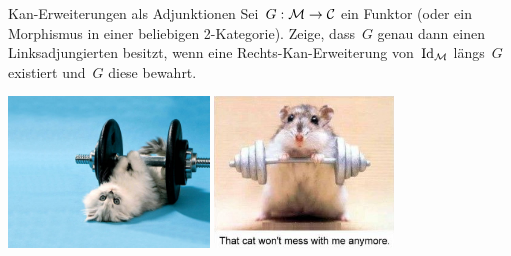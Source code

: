 \documentclass{uebblatt}
\begin{document}

\begin{aufgabe}{Kan-Erweiterungen als Adjunktionen}
Sei~$G : \mathcal{M} \to \mathcal{C}$ ein Funktor (oder ein Morphismus in einer beliebigen
2-Kategorie). Zeige, dass~$G$ genau dann einen Linksadjungierten besitzt, wenn
eine Rechts-Kan-Erweiterung von~$\mathrm{Id}_{\mathcal{M}}$ längs~$G$ existiert und~$G$ diese
bewahrt.
\end{aufgabe}

\centering
\href{http://fashions-cloud.com/pages/c/cat-lifting-weights/}{\includegraphics[height=4cm]{images/lifting-property-1}}
\qquad
\href{http://www.woophotos.com/weight-lifter/}{\includegraphics[height=4cm]{images/lifting-property-2}}
\par
\end{document}
